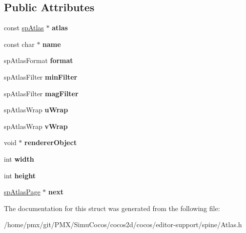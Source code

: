 \subsection*{Public Attributes}
\begin{DoxyCompactItemize}
\item 
\mbox{\label{structspAtlasPage_a4138d607ab0681fd0b54a0fa31988490}} 
const \hyperlink{structspAtlas}{sp\+Atlas} $\ast$ {\bfseries atlas}
\item 
\mbox{\label{structspAtlasPage_a549d5ae58b9e665813185b1c2c32af1a}} 
const char $\ast$ {\bfseries name}
\item 
\mbox{\label{structspAtlasPage_abff7bd3e03f05e81bd4300e41e208e05}} 
sp\+Atlas\+Format {\bfseries format}
\item 
\mbox{\label{structspAtlasPage_ae3f90b2c06f22f9b2189f6efd653ec8e}} 
sp\+Atlas\+Filter {\bfseries min\+Filter}
\item 
\mbox{\label{structspAtlasPage_a281886d65779f0dd836de37097b2fb27}} 
sp\+Atlas\+Filter {\bfseries mag\+Filter}
\item 
\mbox{\label{structspAtlasPage_aa302fb4dca4dfdddf6663d9331a71104}} 
sp\+Atlas\+Wrap {\bfseries u\+Wrap}
\item 
\mbox{\label{structspAtlasPage_ae2a9110c8ca2052f08d59bc7671f246d}} 
sp\+Atlas\+Wrap {\bfseries v\+Wrap}
\item 
\mbox{\label{structspAtlasPage_abc0dab99ccb43709a02f3ddc6849097c}} 
void $\ast$ {\bfseries renderer\+Object}
\item 
\mbox{\label{structspAtlasPage_a798273c5667cf5646e4b3cd4a2487b57}} 
int {\bfseries width}
\item 
\mbox{\label{structspAtlasPage_a3af86676a2859d5e0973614d32a20823}} 
int {\bfseries height}
\item 
\mbox{\label{structspAtlasPage_a4effa2a7195a5a15e1db3b16c193b0eb}} 
\hyperlink{structspAtlasPage}{sp\+Atlas\+Page} $\ast$ {\bfseries next}
\end{DoxyCompactItemize}


The documentation for this struct was generated from the following file\+:\begin{DoxyCompactItemize}
\item 
/home/pmx/git/\+P\+M\+X/\+Simu\+Cocos/cocos2d/cocos/editor-\/support/spine/Atlas.\+h\end{DoxyCompactItemize}

